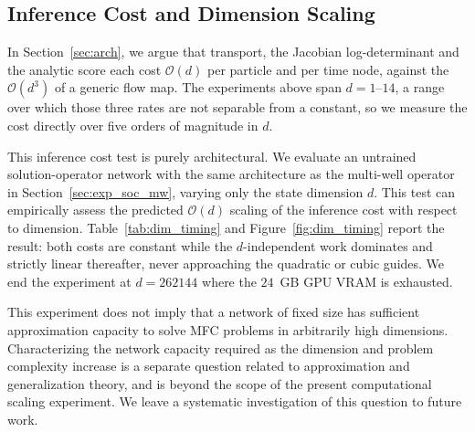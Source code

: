 \documentclass[preprint]{elsarticle}
\begin{document}
\subsection{Inference Cost and Dimension Scaling}
\label{sec:exp_complexity}

In Section~\ref{sec:arch}, we argue that transport, the Jacobian log-determinant and the analytic score each cost $\mathcal O(d)$ per particle and per time node, against the $\mathcal O(d^3)$ of a generic flow map. The experiments above span $d=1$--$14$, a range over which those three rates are not separable from a constant, so we measure the cost directly over five orders of magnitude in $d$.

This inference cost test is purely architectural. We evaluate an untrained solution-operator network with the same architecture as the multi-well operator in Section~\ref{sec:exp_soc_mw}, varying only the state dimension \(d\). This test can empirically assess the predicted  $\mathcal O(d)$ scaling of the inference cost with respect to dimension. Table~\ref{tab:dim_timing} and Figure~\ref{fig:dim_timing} report the result: both costs are constant while the $d$-independent work dominates and strictly linear thereafter, never approaching the quadratic or cubic guides. We end the experiment at $d=262144$ where the $24$~GB GPU VRAM is exhausted. 

This experiment does not imply that a network of fixed size has sufficient approximation capacity to solve MFC problems in arbitrarily high dimensions. Characterizing the network capacity required as the dimension and problem complexity increase is a separate question related to approximation and generalization theory, and is beyond the scope of the present computational scaling experiment. We leave a systematic investigation of this question to future work. 
\end{document}
